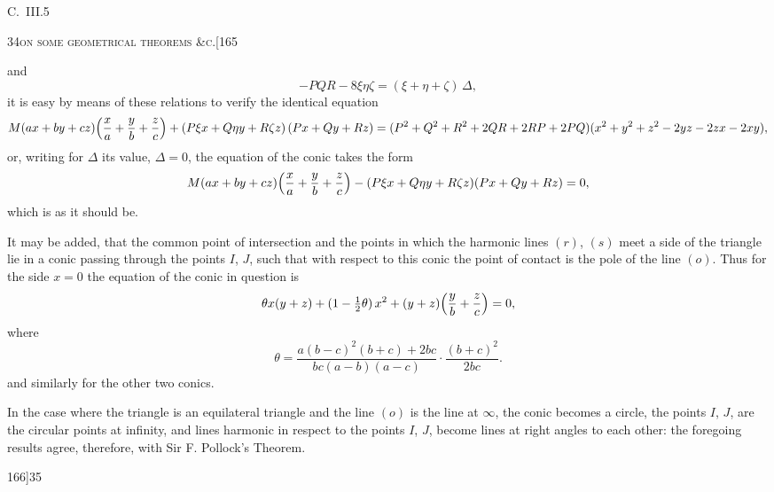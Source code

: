 \documentclass[11pt]{article}
\begin{document}
\begin{flushright}\small C.\ III.\hfill 5\end{flushright}

\newpage

\begin{center}
\small\textsc{34}\hfill\textsc{on some geometrical theorems \&c.}\hfill[165
\end{center}

\medskip

\noindent and
\[
- P Q R - 8\xi\eta\zeta = (\xi + \eta + \zeta)\,\Delta,
\]
it is easy by means of these relations to verify the identical equation
\[
M(ax+by+cz)\Bigl(\frac{x}{a} + \frac{y}{b} + \frac{z}{c}\Bigr) + (P\xi x + Q\eta y + R\zeta z)\,(Px + Qy + Rz)
= (P^{2} + Q^{2} + R^{2} + 2QR + 2RP + 2PQ)(x^{2} + y^{2} + z^{2} - 2yz - 2zx - 2xy),
\]
or, writing for $\Delta$ its value, $\Delta = 0$, the equation of the conic takes the form
\[
M(ax + by + cz)\Bigl(\frac{x}{a} + \frac{y}{b} + \frac{z}{c}\Bigr) - (P\xi x + Q\eta y + R\zeta z)(Px + Qy + Rz) = 0,
\]
which is as it should be.

It may be added, that the common point of intersection and the points in which
the harmonic lines $(r)$, $(s)$ meet a side of the triangle lie in a conic passing through
the points $I$, $J$, such that with respect to this conic the point of contact is the pole
of the line $(o)$. Thus for the side $x = 0$ the equation of the conic in question is
\[
\theta x(y + z) + (1 - \tfrac{1}{2}\theta)\,x^{2} + (y + z)\Bigl(\frac{y}{b} + \frac{z}{c}\Bigr) = 0,
\]
where
\[
\theta = \frac{a(b - c)^{2}(b + c) + 2bc}{bc(a - b)(a - c)} \cdot \frac{(b + c)^{2}}{2bc}.
\]
and similarly for the other two conics.

In the case where the triangle is an equilateral triangle and the line $(o)$ is the
line at $\infty$, the conic becomes a circle, the points $I$, $J$, are the circular points at infinity,
and lines harmonic in respect to the points $I$, $J$, become lines at right angles to
each other: the foregoing results agree, therefore, with Sir F. Pollock's Theorem.

\newpage

\begin{center}
\small 166]\hfill\textsc{35}
\end{center}
\end{document}
